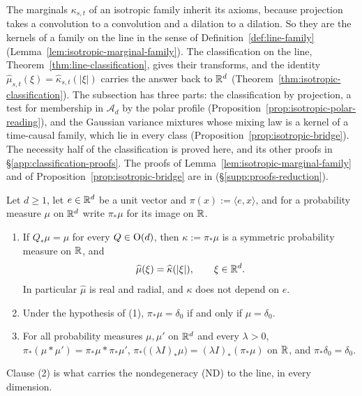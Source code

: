The marginals $\kappa_{s,t}$ of an isotropic family inherit its axioms, because projection takes a
convolution to a convolution and a dilation to a dilation. So they are the kernels of a family on
the line in the sense of Definition~\ref{def:line-family}
(Lemma~\ref{lem:isotropic-marginal-family}). The classification on the line,
Theorem~\ref{thm:line-classification}, gives their transforms, and the identity
$\widehat\mu_{s,t}(\xi) = \widehat\kappa_{s,t}(|\xi|)$ carries the answer back to $\mathbb{R}^d$
(Theorem~\ref{thm:isotropic-classification}). The subsection has three parts: the classification
by projection, a test for membership in $\mathcal{A}_d$ by the polar profile
(Proposition~\ref{prop:isotropic-polar-reading}), and the Gaussian variance mixtures whose
mixing law is a kernel of a time-causal family, which lie in every class
(Proposition~\ref{prop:isotropic-bridge}). The necessity half of the
classification is proved here, and its other proofs in \S\ref{app:classification-proofs}.
The proofs of Lemma~\ref{lem:isotropic-marginal-family} and of
Proposition~\ref{prop:isotropic-bridge} are in \suppl{} (\S\ref{supp:proofs-reduction}).

\begin{lemma}\label{lem:radial-marginal}
Let $d \ge 1$, let $e \in \mathbb{R}^d$ be a unit vector and $\pi(x) := \langle e, x\rangle$, and for a
probability measure $\mu$ on $\mathbb{R}^d$ write $\pi_*\mu$ for its image on $\mathbb{R}$.
\begin{enumerate}
\item If $Q_*\mu = \mu$ for every $Q \in \mathrm{O}(d)$, then $\kappa := \pi_*\mu$ is a symmetric
probability measure on $\mathbb{R}$, and
\[
  \widehat\mu(\xi) = \widehat\kappa(|\xi|), \qquad \xi \in \mathbb{R}^d .
\]
In particular $\widehat\mu$ is real and radial, and $\kappa$ does not depend on $e$.
\item Under the hypothesis of (1), $\pi_*\mu = \delta_0$ if and only if $\mu = \delta_0$.
\item For all probability measures $\mu, \mu'$ on $\mathbb{R}^d$ and every $\lambda > 0$,
$\pi_*(\mu * \mu') = \pi_*\mu * \pi_*\mu'$, $\pi_*\bigl((\lambda I)_*\mu\bigr) =
(\lambda I)_*(\pi_*\mu)$ on $\mathbb{R}$, and $\pi_*\delta_0 = \delta_0$.
\end{enumerate}
\end{lemma}

Clause (2) is what carries the nondegeneracy (ND) to the line, in every dimension.


